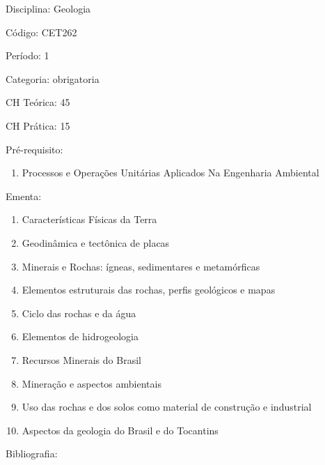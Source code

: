 \documentclass[12pt,a4paper,twoside]{report}
\begin{document}
Disciplina: Geologia

Código: CET262

Período: 1

Categoria: obrigatoria

CH Teórica: 45

CH Prática: 15




Pré-requisito:
\begin{enumerate}
\item Processos e Operações Unitárias Aplicados Na Engenharia Ambiental
\end{enumerate}

Ementa:
\begin{enumerate}
\item Características Físicas da Terra
\item Geodinâmica e tectônica de placas
\item Minerais e Rochas: ígneas, sedimentares e metamórficas
\item Elementos estruturais das rochas, perfis geológicos e mapas
\item Ciclo das rochas e da água
\item Elementos de hidrogeologia
\item Recursos Minerais do Brasil
\item Mineração e aspectos ambientais
\item Uso das rochas e dos solos como material de construção e industrial
\item Aspectos da geologia do Brasil e do Tocantins
\end{enumerate}



Bibliografia:
\end{document}
